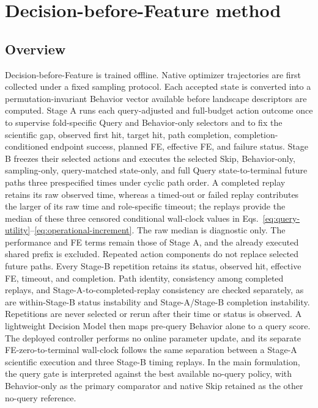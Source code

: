 \section{Decision-before-Feature method}
\label{sec:method}

\subsection{Overview}

Decision-before-Feature is trained offline.  Native optimizer trajectories are first collected under a fixed sampling protocol.  Each accepted state is converted into a permutation-invariant Behavior vector available before landscape descriptors are computed.  Stage A runs each query-adjusted and full-budget action outcome once to supervise fold-specific Query and Behavior-only selectors and to fix the scientific gap, observed first hit, target hit, path completion, completion-conditioned endpoint success, planned FE, effective FE, and failure status.  Stage B freezes their selected actions and executes the selected Skip, Behavior-only, sampling-only, query-matched state-only, and full Query state-to-terminal future paths three prespecified times under cyclic path order.  A completed replay retains its raw observed time, whereas a timed-out or failed replay contributes the larger of its raw time and role-specific timeout; the replays provide the median of these three censored conditional wall-clock values in Eqs.~\eqref{eq:query-utility}--\eqref{eq:operational-increment}.  The raw median is diagnostic only.  The performance and FE terms remain those of Stage A, and the already executed shared prefix is excluded.  Repeated action components do not replace selected future paths.  Every Stage-B repetition retains its status, observed hit, effective FE, timeout, and completion.  Path identity, consistency among completed replays, and Stage-A-to-completed-replay consistency are checked separately, as are within-Stage-B status instability and Stage-A/Stage-B completion instability.  Repetitions are never selected or rerun after their time or status is observed.  A lightweight Decision Model then maps pre-query Behavior alone to a query score.  The deployed controller performs no online parameter update, and its separate FE-zero-to-terminal wall-clock follows the same separation between a Stage-A scientific execution and three Stage-B timing replays.  In the main formulation, the query gate is interpreted against the best available no-query policy, with Behavior-only as the primary comparator and native Skip retained as the other no-query reference.

